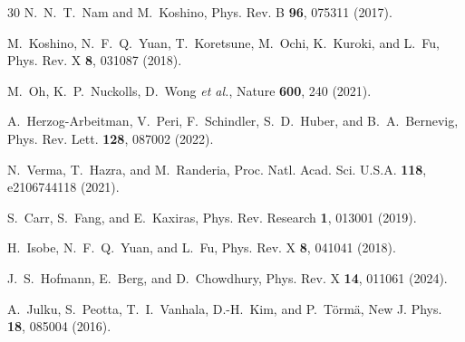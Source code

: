 \documentclass[prb,twocolumn,superscriptaddress,floatfix]{revtex4-2}
\begin{document}
\begin{thebibliography}{30}
N.~N.~T.~Nam and M.~Koshino, Phys. Rev. B \textbf{96}, 075311 (2017).

M.~Koshino, N.~F.~Q.~Yuan, T.~Koretsune, M.~Ochi, K.~Kuroki, and L.~Fu, Phys. Rev. X \textbf{8}, 031087 (2018).

M.~Oh, K.~P.~Nuckolls, D.~Wong \textit{et al.}, Nature \textbf{600}, 240 (2021).

A.~Herzog-Arbeitman, V.~Peri, F.~Schindler, S.~D.~Huber, and B.~A.~Bernevig, Phys. Rev. Lett. \textbf{128}, 087002 (2022).

N.~Verma, T.~Hazra, and M.~Randeria, Proc. Natl. Acad. Sci. U.S.A. \textbf{118}, e2106744118 (2021).

S.~Carr, S.~Fang, and E.~Kaxiras, Phys. Rev. Research \textbf{1}, 013001 (2019).

H.~Isobe, N.~F.~Q.~Yuan, and L.~Fu, Phys. Rev. X \textbf{8}, 041041 (2018).

J.~S.~Hofmann, E.~Berg, and D.~Chowdhury, Phys. Rev. X \textbf{14}, 011061 (2024).

A.~Julku, S.~Peotta, T.~I.~Vanhala, D.-H.~Kim, and P.~T\"orm\"a, New J. Phys. \textbf{18}, 085004 (2016).

\end{thebibliography}
\end{document}
